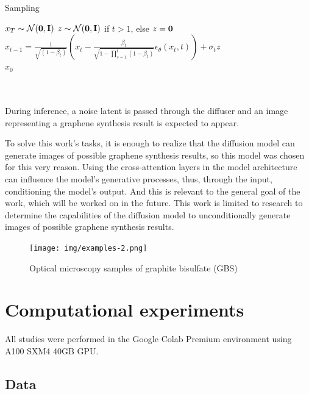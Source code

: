 \documentclass[runningheads]{llncs}
\begin{document}
\begin{minipage}{0.47\textwidth}
    \begin{algorithm}[H]
        \caption{Sampling}
        \begin{algorithmic}
            \vspace{7pt}
            \State $x_T \sim \mathcal{N}(\bold{0}, \bold{I})$
                \State $z \sim \mathcal{N}(\bold{0}, \bold{I})$ if $t > 1$, else $z = \bold{0}$
                \State $x_{t-1} = \frac{1}{\sqrt{(1 - \beta_t)}}(x_t - \frac{\beta_t}{\sqrt{1 - \prod_{s=1}^t(1 - \beta_t)}}\epsilon_\theta(x_t, t)) + \sigma_tz$
            \EndFor \\
            \Return $x_0$
            \vspace{10pt}
        \end{algorithmic}
    \end{algorithm}
\end{minipage}
\\
\\
During inference, a noise latent is passed through the diffuser and an image representing a graphene synthesis result is expected to appear.
\par
To solve this work's tasks, it is enough to realize that the diffusion model can generate images of possible graphene synthesis results, so this model was chosen for this very reason. Using the cross-attention layers in the model architecture can influence the model's generative processes, thus, through the input, conditioning the model's output. And this is relevant to the general goal of the work, which will be worked on in the future. This work is limited to research to determine the capabilities of the diffusion model to unconditionally generate images of possible graphene synthesis results.

\begin{figure}[h]
    \centering
    \texttt{[image: img/examples-2.png]}
    \caption{Optical microscopy samples of graphite bisulfate (GBS)}
\end{figure}

\section{Computational experiments}

All studies were performed in the Google Colab Premium environment using A100 SXM4 40GB GPU.

\subsection{Data}
\end{document}
